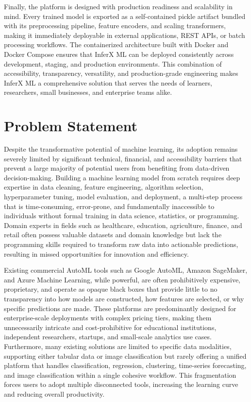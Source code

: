 Finally, the platform is designed with production readiness and scalability in mind. Every trained model is exported as a self-contained pickle artifact bundled with its preprocessing pipeline, feature encoders, and scaling transformers, making it immediately deployable in external applications, REST APIs, or batch processing workflows. The containerized architecture built with Docker and Docker Compose ensures that InferX ML can be deployed consistently across development, staging, and production environments. This combination of accessibility, transparency, versatility, and production-grade engineering makes InferX ML a comprehensive solution that serves the needs of learners, researchers, small businesses, and enterprise teams alike.\vspace{0.3cm}

\newpage
\section{Problem Statement}

\hspace{0.5cm}Despite the transformative potential of machine learning, its adoption remains severely limited by significant technical, financial, and accessibility barriers that prevent a large majority of potential users from benefiting from data-driven decision-making. Building a machine learning model from scratch requires deep expertise in data cleaning, feature engineering, algorithm selection, hyperparameter tuning, model evaluation, and deployment, a multi-step process that is time-consuming, error-prone, and fundamentally inaccessible to individuals without formal training in data science, statistics, or programming. Domain experts in fields such as healthcare, education, agriculture, finance, and retail often possess valuable datasets and domain knowledge but lack the programming skills required to transform raw data into actionable predictions, resulting in missed opportunities for innovation and efficiency.\vspace{0.3cm}

Existing commercial AutoML tools such as Google AutoML, Amazon SageMaker, and Azure Machine Learning, while powerful, are often prohibitively expensive, proprietary, and operate as opaque black boxes that provide little to no transparency into how models are constructed, how features are selected, or why specific predictions are made. These platforms are predominantly designed for enterprise-scale deployments with complex pricing tiers, making them unnecessarily intricate and cost-prohibitive for educational institutions, independent researchers, startups, and small-scale analytics use cases. Furthermore, many existing solutions are limited to specific data modalities, supporting either tabular data or image classification but rarely offering a unified platform that handles classification, regression, clustering, time-series forecasting, and image classification within a single cohesive workflow. This fragmentation forces users to adopt multiple disconnected tools, increasing the learning curve and reducing overall productivity.\vspace{0.3cm}

